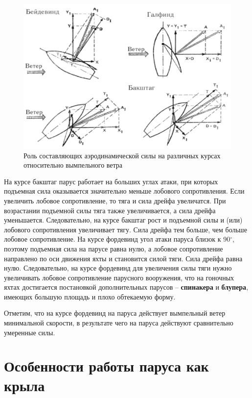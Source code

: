 \documentclass[a4paper, 12pt, twoside, final, book, russian, fittopage, cyremdash]{ncc}
\newcommand{\gr}{\ensuremath{^\circ}\xspace}
\begin{document}
\begin{figure}[htb]
  \centering
  \includegraphics[scale=1]{0020}
  \caption{Роль составляющих аэродинамической силы на различных курсах относительно вымпельного ветра}
  \label{fig:20}
\end{figure}

На курсе бакштаг парус работает на больших углах атаки, при которых подъемная сила оказывается значительно меньше лобового сопротивления. Если увеличить лобовое сопротивление, то тяга и сила дрейфа увеличатся. При возрастании подъемной силы тяга также увеличивается, а сила дрейфа уменьшается. Следовательно, на курсе бакштаг рост и подъемной силы и (или) лобового сопротивления увеличивает тягу. Сила дрейфа тем больше, чем больше лобовое сопротивление. На курсе фордевинд угол атаки паруса близок к 90\gr, поэтому подъемная сила на парусе равна нулю, а лобовое сопротивление направлено по оси движения яхты и становится силой тяги. Сила дрейфа равна нулю. Следовательно, на курсе фордевинд для увеличения силы тяги нужно увеличивать лобовое сопротивление парусного вооружения, что на гоночных яхтах достигается постановкой дополнительных парусов \--- \textbf{спинакера} и \textbf{блупера}, имеющих большую площадь и плохо обтекаемую форму. 

Отметим, что на курсе фордевинд на паруса действует вымпельный ветер минимальной скорости, в результате чего на паруса действуют сравнительно умеренные силы.

\section{Особенности работы паруса как крыла}
\end{document}
